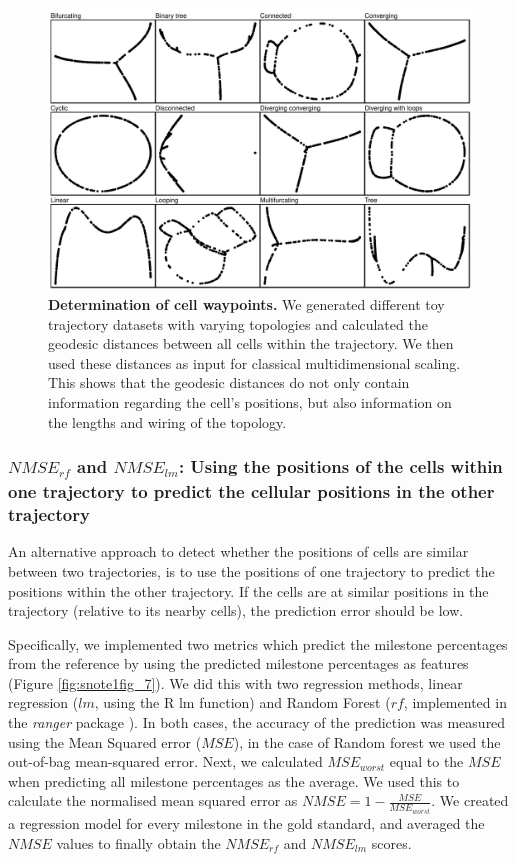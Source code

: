 \begin{figure}[htb!]
	\centering\includegraphics[width=\linewidth]{fig/snote1fig_6.pdf}
	\caption{
		\textbf{Determination of cell waypoints.} 
		We generated different toy trajectory datasets with varying topologies and calculated the geodesic distances between all cells within the trajectory. We then used these distances as input for classical multidimensional scaling. This shows that the geodesic distances do not only contain information regarding the cell's positions, but also information on the lengths and wiring of the topology.
	}
	\label{fig:snote1fig_6}
\end{figure}

\subsubsection{$\textit{NMSE}_{\textit{rf}}$ and $\textit{NMSE}_{\textit{lm}}$: Using the positions of the cells within one trajectory to predict the cellular positions in the other trajectory}

An alternative approach to detect whether the positions of cells are similar between two trajectories, is to use the positions of one trajectory to predict the positions within the other trajectory. If the cells are at similar positions in the trajectory (relative to its nearby cells), the prediction error should be low.

Specifically, we implemented two metrics which predict the milestone percentages from the reference by using the predicted milestone percentages as features (Figure \ref{fig:snote1fig_7}). We did this with two regression methods, linear regression ($\textit{lm}$, using the R lm function) and Random Forest ($\textit{rf}$, implemented in the \textit{ranger} package  \cite{wright_rangerfastimplementation_2017}). In both cases, the accuracy of the prediction was measured using the Mean Squared error ($\mathit{MSE}$), in the case of Random forest we used the out-of-bag mean-squared error. Next, we calculated $\mathit{MSE}_{worst}$ equal to the $\mathit{MSE}$ when predicting all milestone percentages as the average. We used this to calculate the normalised mean squared error as $\mathit{NMSE} = 1 - \frac{\mathit{MSE}}{\mathit{MSE}_{worst}}$. We created a regression model for every milestone in the gold standard, and averaged the $\mathit{NMSE}$ values to finally obtain the $\textit{NMSE}_{\textit{rf}}$ and $\textit{NMSE}_{\textit{lm}}$ scores.


